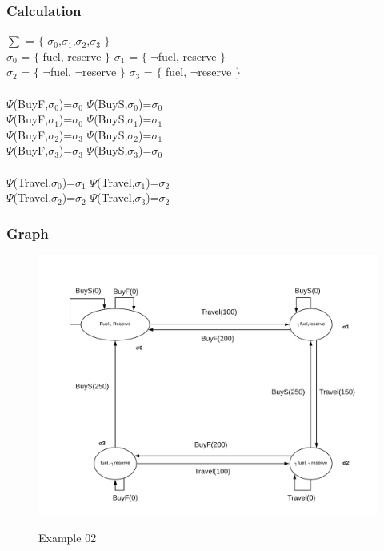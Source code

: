\documentclass[11pt]{article}
\begin{document}
\subsubsection{Calculation}\label{par:p301}\par
$\sum$ = $\lbrace$ $\sigma_{0}$,$\sigma_{1}$,$\sigma_{2}$,$\sigma_{3}$ $\rbrace$\\
$\sigma_{0}$ = $\lbrace$ fuel, reserve $\rbrace$ \indent $\sigma_{1}$ = $\lbrace$ $\neg$fuel, reserve $\rbrace$\\
$\sigma_{2}$ = $\lbrace$ $\neg$fuel, $\neg$reserve $\rbrace$ \indent $\sigma_{3}$ = $\lbrace$ fuel, $\neg$reserve $\rbrace$\\
\\
$\Psi$(BuyF,$\sigma_{0}$)=$\sigma_{0}$ \indent $\Psi$(BuyS,$\sigma_{0}$)=$\sigma_{0}$\\
$\Psi$(BuyF,$\sigma_{1}$)=$\sigma_{0}$ \indent $\Psi$(BuyS,$\sigma_{1}$)=$\sigma_{1}$\\
$\Psi$(BuyF,$\sigma_{2}$)=$\sigma_{3}$ \indent $\Psi$(BuyS,$\sigma_{2}$)=$\sigma_{1}$\\
$\Psi$(BuyF,$\sigma_{3}$)=$\sigma_{3}$ \indent $\Psi$(BuyS,$\sigma_{3}$)=$\sigma_{0}$\\
\\
$\Psi$(Travel,$\sigma_{0}$)=$\sigma_{1}$\indent
$\Psi$(Travel,$\sigma_{1}$)=$\sigma_{2}$\\
$\Psi$(Travel,$\sigma_{2}$)=$\sigma_{2}$\indent
$\Psi$(Travel,$\sigma_{3}$)=$\sigma_{2}$\\
\subsubsection{Graph}\label{par:p401}
	\begin{figure}[H]
		\includegraphics[width=1\linewidth, height=0.3\textheight]{./media/ex01.png}
		\label{Figure:f01}
		\caption{Example 02}
	\end{figure}
\end{document}
